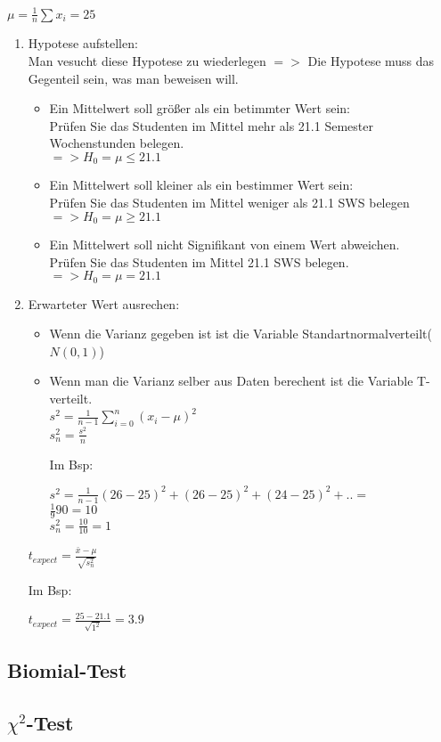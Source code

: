 \documentclass[a4paper, 11pt]{article}
\begin{document}
$\mu = \frac {1} {n} \sum x_i = 25$
\begin{enumerate}
  \item Hypotese aufstellen:\\
     Man vesucht diese Hypotese zu wiederlegen $=>$ Die Hypotese muss das Gegenteil sein, was man beweisen will.
     \begin {itemize}
       \item Ein Mittelwert soll größer als ein betimmter Wert sein:\\
         Prüfen Sie das Studenten im Mittel mehr als 21.1 Semester Wochenstunden belegen.\\
         $=> H_0 = \mu \leq 21.1$
       \item Ein Mittelwert soll kleiner als ein bestimmer Wert sein:\\
         Prüfen Sie das Studenten im Mittel weniger als 21.1 SWS belegen\\
         $=> H_0 = \mu \geq 21.1$
       \item Ein Mittelwert soll nicht Signifikant von einem Wert abweichen.\\
         Prüfen Sie das Studenten im Mittel 21.1 SWS belegen.\\
         $=> H_0 = \mu = 21.1$
     \end{itemize}

   \item Erwarteter Wert ausrechen: \\
     \begin {itemize}
       \item
         Wenn die Varianz gegeben ist ist die Variable Standartnormalverteilt($N(0,1)$)
       \item 
         Wenn man die Varianz selber aus Daten berechent ist die Variable T-verteilt.\\
         $s^2 = \frac 1 {n-1} \sum_{i = 0} ^ n (x_i - \mu) ^2$\\
       $s_n^2 = \frac {s^2} n$

         Im Bsp: 

         $s^2 = \frac 1 {n-1} (26 - 25)^2 +(26 - 25)^2 + (24 - 25)^2 + ..  = $\\
         $      \frac 1 {9} 90 = 10$\\
         $s_n^2 = \frac {10} {10} = 1$

     \end {itemize}

     $ t_{expect} = \frac{\bar{x} - \mu} { \sqrt{s_n^2}}$

     Im Bsp:

     $ t_{expect} = \frac{ 25 - 21.1} { \sqrt{1^2}} = 3.9$
\end{enumerate}
\subsection{Biomial-Test}
\subsection{$\chi^2$-Test}
\end{document}

